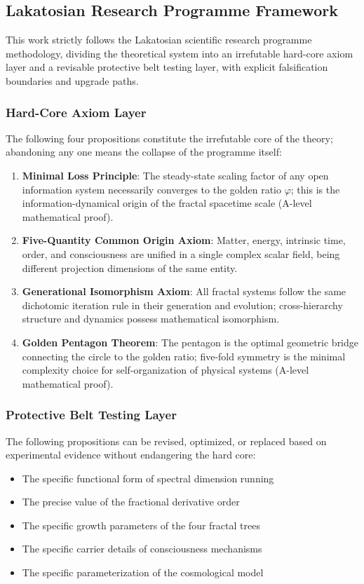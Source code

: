 \documentclass[12pt,a4paper,twocolumn]{article}
\renewcommand{\phi}{\varphi}
\begin{document}
\subsection{Lakatosian Research Programme Framework}
This work strictly follows the Lakatosian scientific research programme methodology, dividing the theoretical system into an irrefutable hard-core axiom layer and a revisable protective belt testing layer, with explicit falsification boundaries and upgrade paths.

\subsubsection{Hard-Core Axiom Layer}
The following four propositions constitute the irrefutable core of the theory; abandoning any one means the collapse of the programme itself:
\begin{enumerate}
\item \textbf{Minimal Loss Principle}: The steady-state scaling factor of any open information system necessarily converges to the golden ratio $\phi$; this is the information-dynamical origin of the fractal spacetime scale (A-level mathematical proof).
\item \textbf{Five-Quantity Common Origin Axiom}: Matter, energy, intrinsic time, order, and consciousness are unified in a single complex scalar field, being different projection dimensions of the same entity.
\item \textbf{Generational Isomorphism Axiom}: All fractal systems follow the same dichotomic iteration rule in their generation and evolution; cross-hierarchy structure and dynamics possess mathematical isomorphism.
\item \textbf{Golden Pentagon Theorem}: The pentagon is the optimal geometric bridge connecting the circle to the golden ratio; five-fold symmetry is the minimal complexity choice for self-organization of physical systems (A-level mathematical proof).
\end{enumerate}

\subsubsection{Protective Belt Testing Layer}
The following propositions can be revised, optimized, or replaced based on experimental evidence without endangering the hard core:
\begin{itemize}
\item The specific functional form of spectral dimension running
\item The precise value of the fractional derivative order
\item The specific growth parameters of the four fractal trees
\item The specific carrier details of consciousness mechanisms
\item The specific parameterization of the cosmological model
\end{itemize}
\end{document}

